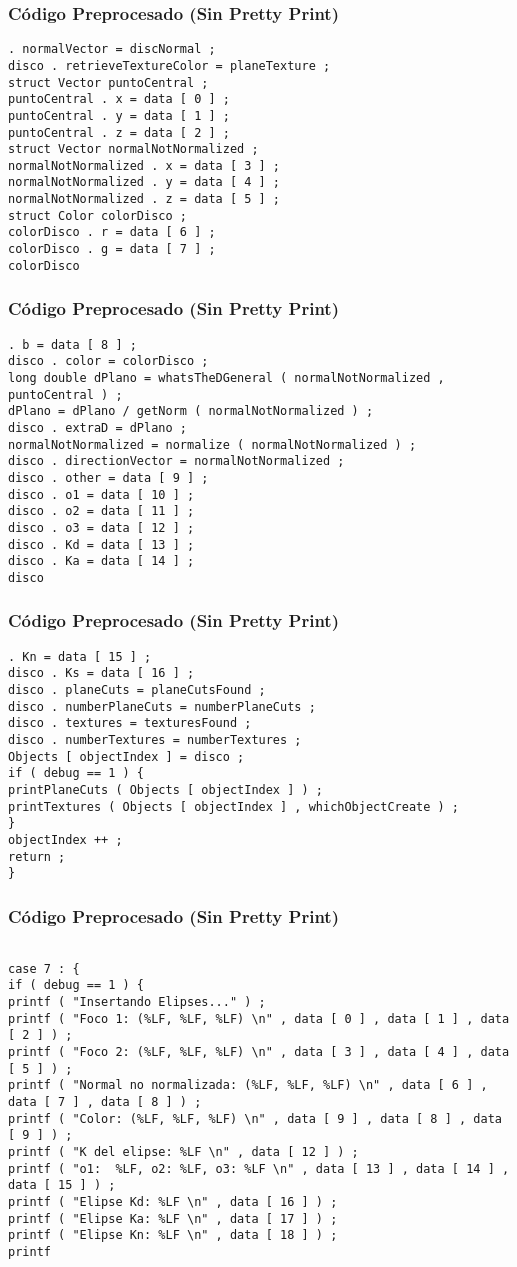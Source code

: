 \documentclass{beamer}
\begin{document}
\begin{frame}[fragile]
\frametitle{C\'odigo Preprocesado (Sin Pretty Print)}
\begin{lstlisting}[style=CStyle]
. normalVector = discNormal ; 
disco . retrieveTextureColor = planeTexture ; 
struct Vector puntoCentral ; 
puntoCentral . x = data [ 0 ] ; 
puntoCentral . y = data [ 1 ] ; 
puntoCentral . z = data [ 2 ] ; 
struct Vector normalNotNormalized ; 
normalNotNormalized . x = data [ 3 ] ; 
normalNotNormalized . y = data [ 4 ] ; 
normalNotNormalized . z = data [ 5 ] ; 
struct Color colorDisco ; 
colorDisco . r = data [ 6 ] ; 
colorDisco . g = data [ 7 ] ; 
colorDisco \end{lstlisting}
\end{frame}
\begin{frame}[fragile]
\frametitle{C\'odigo Preprocesado (Sin Pretty Print)}
\begin{lstlisting}[style=CStyle]
. b = data [ 8 ] ; 
disco . color = colorDisco ; 
long double dPlano = whatsTheDGeneral ( normalNotNormalized , puntoCentral ) ; 
dPlano = dPlano / getNorm ( normalNotNormalized ) ; 
disco . extraD = dPlano ; 
normalNotNormalized = normalize ( normalNotNormalized ) ; 
disco . directionVector = normalNotNormalized ; 
disco . other = data [ 9 ] ; 
disco . o1 = data [ 10 ] ; 
disco . o2 = data [ 11 ] ; 
disco . o3 = data [ 12 ] ; 
disco . Kd = data [ 13 ] ; 
disco . Ka = data [ 14 ] ; 
disco \end{lstlisting}
\end{frame}
\begin{frame}[fragile]
\frametitle{C\'odigo Preprocesado (Sin Pretty Print)}
\begin{lstlisting}[style=CStyle]
. Kn = data [ 15 ] ; 
disco . Ks = data [ 16 ] ; 
disco . planeCuts = planeCutsFound ; 
disco . numberPlaneCuts = numberPlaneCuts ; 
disco . textures = texturesFound ; 
disco . numberTextures = numberTextures ; 
Objects [ objectIndex ] = disco ; 
if ( debug == 1 ) { 
printPlaneCuts ( Objects [ objectIndex ] ) ; 
printTextures ( Objects [ objectIndex ] , whichObjectCreate ) ; 
} 
objectIndex ++ ; 
return ; 
} \end{lstlisting}
\end{frame}
\begin{frame}[fragile]
\frametitle{C\'odigo Preprocesado (Sin Pretty Print)}
\begin{lstlisting}[style=CStyle]

case 7 : { 
if ( debug == 1 ) { 
printf ( "Insertando Elipses..." ) ; 
printf ( "Foco 1: (%LF, %LF, %LF) \n" , data [ 0 ] , data [ 1 ] , data [ 2 ] ) ; 
printf ( "Foco 2: (%LF, %LF, %LF) \n" , data [ 3 ] , data [ 4 ] , data [ 5 ] ) ; 
printf ( "Normal no normalizada: (%LF, %LF, %LF) \n" , data [ 6 ] , data [ 7 ] , data [ 8 ] ) ; 
printf ( "Color: (%LF, %LF, %LF) \n" , data [ 9 ] , data [ 8 ] , data [ 9 ] ) ; 
printf ( "K del elipse: %LF \n" , data [ 12 ] ) ; 
printf ( "o1:  %LF, o2: %LF, o3: %LF \n" , data [ 13 ] , data [ 14 ] , data [ 15 ] ) ; 
printf ( "Elipse Kd: %LF \n" , data [ 16 ] ) ; 
printf ( "Elipse Ka: %LF \n" , data [ 17 ] ) ; 
printf ( "Elipse Kn: %LF \n" , data [ 18 ] ) ; 
printf \end{lstlisting}
\end{frame}
\end{document}
